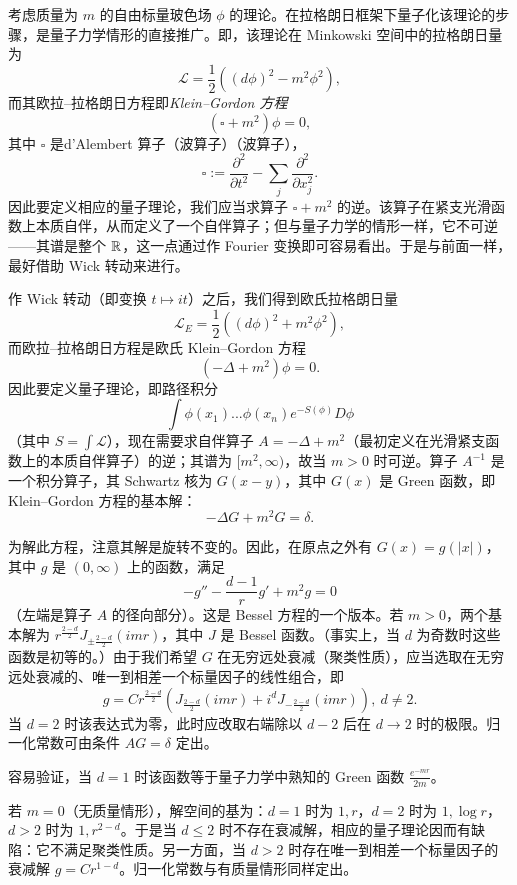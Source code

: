 考虑质量为 $m$ 的自由标量玻色场 $\phi$ 的理论。在拉格朗日框架下量子化该理论的步骤，是量子力学情形的直接推广。即，该理论在 Minkowski 空间中的拉格朗日量为
$$
{\mathcal L}=\frac{1}{2}((d\phi)^2-m^2\phi^2),
$$
而其欧拉–拉格朗日方程即\emph{Klein--Gordon 方程}
$$
(\square+m^2)\phi=0,
$$
其中 $\square$ 是d'Alembert 算子（波算子）（波算子），
$$
\square:=\frac{\partial^2}{\partial t^2}-
\sum_j \frac{\partial^2}{\partial x_j^2}.
$$
因此要定义相应的量子理论，我们应当求算子 $\square+m^2$ 的逆。该算子在紧支光滑函数上本质自伴，从而定义了一个自伴算子；但与量子力学的情形一样，它不可逆——其谱是整个 $\Bbb R$，这一点通过作 Fourier 变换即可容易看出。于是与前面一样，最好借助 Wick 转动来进行。

作 Wick 转动（即变换 $t\mapsto it$）之后，我们得到欧氏拉格朗日量
$$
{\mathcal L}_E=\frac{1}{2}((d\phi)^2+m^2\phi^2),
$$
而欧拉–拉格朗日方程是欧氏 Klein--Gordon 方程
$$
(-\Delta+m^2)\phi=0.
$$
因此要定义量子理论，即路径积分
$$
\int \phi(x_1)...\phi(x_n)e^{-S(\phi)}D\phi
$$
（其中 $S=\int {\mathcal L}$），现在需要求自伴算子 $A=-\Delta+m^2$（最初定义在光滑紧支函数上的本质自伴算子）的逆；其谱为 $[m^2,\infty)$，故当 $m>0$ 时可逆。算子 $A^{-1}$ 是一个积分算子，其 Schwartz 核为 $G(x-y)$，其中 $G(x)$ 是 Green 函数，即 Klein--Gordon 方程的基本解：
$$
-\Delta G+m^2G=\delta.
$$

为解此方程，注意其解是旋转不变的。因此，在原点之外有 $G(x)=g(|x|)$，其中 $g$ 是 $(0,\infty)$ 上的函数，满足
$$
-g''-\frac{d-1}{r}g'+m^2g=0
$$
（左端是算子 $A$ 的径向部分）。这是 Bessel 方程的一个版本。若 $m>0$，两个基本解为 $r^{\frac{2-d}{2}} J_{\pm\frac{2-d}{2}}(imr)$，其中 $J$ 是 Bessel 函数。（事实上，当 $d$ 为奇数时这些函数是初等的。）由于我们希望 $G$ 在无穷远处衰减（聚类性质），应当选取在无穷远处衰减的、唯一到相差一个标量因子的线性组合，即
\begin{equation}\label{bess}
g=Cr^{\frac{2-d}{2}}(J_{\frac{2-d}{2}}(imr)+i^d
J_{-\frac{2-d}{2}}(imr)),\ d\ne 2. 
\end{equation}
当 $d=2$ 时该表达式为零，此时应改取右端除以 $d-2$ 后在 $d\to 2$ 时的极限。归一化常数可由条件 $AG=\delta$ 定出。

\begin{remark} 容易验证，当 $d=1$ 时该函数等于量子力学中熟知的 Green 函数 $\frac{e^{-mr}}{2m}$。
\end{remark}

若 $m=0$（无质量情形），解空间的基为：$d=1$ 时为 $1,r$，$d=2$ 时为 $1, \log r$，$d>2$ 时为 $1, r^{2-d}$。于是当 $d\le 2$ 时不存在衰减解，相应的量子理论因而有缺陷：它不满足聚类性质。另一方面，当 $d>2$ 时存在唯一到相差一个标量因子的衰减解 $g=Cr^{1-d}$。归一化常数与有质量情形同样定出。

